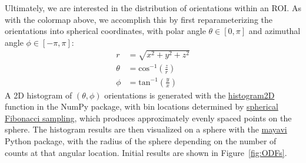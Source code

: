 \documentclass[11pt]{article}
\begin{document}
Ultimately, we are interested in the distribution of orientations within an
ROI. As with the colormap above, we accomplish this by first reparameterizing
the orientations into spherical coordinates, with polar angle
$\theta \in [0,\pi]$ and azimuthal angle $\phi\in[-\pi,\pi]$:
\begin{align}
  \label{eq:sphcoords}
  r &= \sqrt{x^2 + y^2 + z^2}\\[5pt]
  \theta &= \text{cos}^{-1}\left(\frac{z}{r}\right)\\[5pt]
  \phi &= \text{tan}^{-1}\left(\frac{y}{x}\right)
\end{align}
A 2D histogram of $(\theta, \phi)$ orientations is generated with the
\href{https://docs.scipy.org/doc/numpy/reference/generated/numpy.histogram2d.html}{histogram2D}
function in the NumPy package, with bin locations determined by
\href{http://lgdv.cs.fau.de/uploads/publications/spherical_fibonacci_mapping_opt.pdf}{spherical
  Fibonacci sampling}, which produces approximately evenly spaced points on the
sphere. The histogram results are then visualized on a sphere with the
\href{http://docs.enthought.com/mayavi/mayavi/mlab.html}{mayavi} Python package,
with the radius of the sphere depending on the number of counts at that angular
location. Initial results are shown in Figure~\ref{fig:ODFs}.
\end{document}
